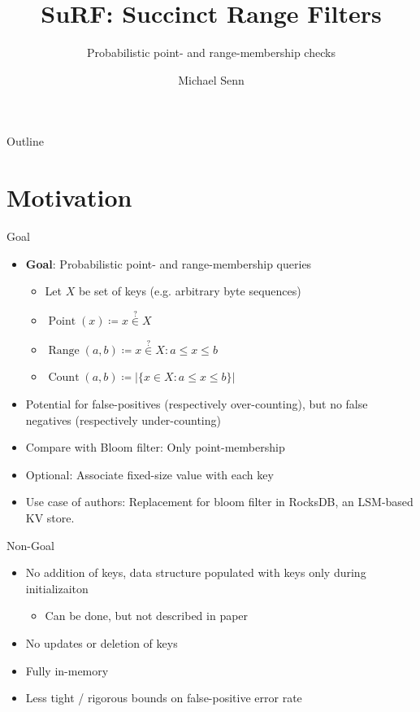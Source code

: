 \documentclass{beamer}
\title{SuRF: Succinct Range Filters}
\subtitle{Probabilistic point- and range-membership checks}
\author{Michael Senn}
\institute{Faculty of Science, University of Bern}
\date{\DTMusedate{presentation}}
\begin{document}
\maketitle

\begin{frame}{Outline}
		\tableofcontents
\end{frame}


\section{Motivation}

\begin{frame}{Goal}
		\begin{itemize}
				\item \textbf{Goal}: Probabilistic point- and range-membership queries
						\begin{itemize}
								\item Let $X$ be set of keys (e.g. arbitrary byte sequences)
								\item $\operatorname{Point}(x) \coloneqq x \overset{?}{\in} X$
								\item $\operatorname{Range}(a, b) \coloneqq x \overset{?}{\in} X : a \leq x \leq b$
								\item $\operatorname{Count}(a, b) \coloneqq |\{x \in X : a \leq x \leq b\}|$
						\end{itemize}
				\item Potential for false-positives (respectively
						over-counting), but no false negatives (respectively
						under-counting)
				\item Compare with Bloom filter: Only point-membership
				\item Optional: Associate fixed-size value with each key
				\item Use case of authors: Replacement for bloom filter in
						RocksDB, an LSM-based KV store.
		\end{itemize}
\end{frame}

\begin{frame}{Non-Goal}
		\begin{itemize}
				\item No addition of keys, data structure populated with keys
						only during initializaiton
						\begin{itemize}
								\item Can be done, but not described in paper
						\end{itemize}
				\item No updates or deletion of keys
				\item Fully in-memory
				\item Less tight / rigorous bounds on false-positive error rate
		\end{itemize}
\end{frame}
\end{document}
